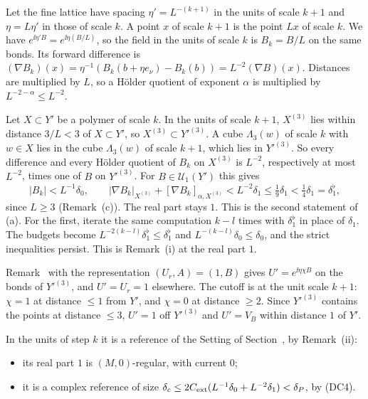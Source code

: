 \begin{step}
Let the fine lattice have spacing $\eta'=L^{-(k+1)}$ in the units of scale $k+1$ and $\eta=L\eta'$ in those of scale $k$. A point $x$ of scale $k+1$ is the point $Lx$ of scale $k$. We have $e^{\ii\eta'B}=e^{\ii\eta(B/L)}$, so the field in the units of scale $k$ is $B_k=B/L$ on the same bonds. Its forward difference is $(\nabla B_k)(x)=\eta^{-1}(B_k(b+\eta e_\nu)-B_k(b))=L^{-2}(\nabla B)(x)$. Distances are multiplied by $L$, so a Hölder quotient of exponent $\alpha$ is multiplied by $L^{-2-\alpha}\le L^{-2}$.

Let $X\subset Y'$ be a polymer of scale $k$. In the units of scale $k+1$, $X^{(3)}$ lies within distance $3/L<3$ of $X\subset Y'$, so $X^{(3)}\subset Y'^{(3)}$. A cube $\Lambda_3(w)$ of scale $k$ with $w\in X$ lies in the cube $\Lambda_3(w)$ of scale $k+1$, which lies in $Y'^{(3)}$. So every difference and every Hölder quotient of $B_k$ on $X^{(3)}$ is $L^{-2}$, respectively at most $L^{-2}$, times one of $B$ on $Y'^{(3)}$. For $B\in\mathcal U_1(Y')$ this gives
\[
|B_k|<L^{-1}\delta_0,\qquad|\nabla B_k|_{X^{(3)}}+[\nabla B_k]_{\alpha,X^{(3)}}<L^{-2}\delta_1\le\tfrac19\delta_1<\tfrac14\delta_1=\delta_1^\flat ,
\]
since $L\ge3$ (Remark~(c)). The real part stays $1$. This is the second statement of (a). For the first, iterate the same computation $k-l$ times with $\delta_1^\flat$ in place of $\delta_1$. The budgets become $L^{-2(k-l)}\delta_1^\flat\le\delta_1^\flat$ and $L^{-(k-l)}\delta_0\le\delta_0$, and the strict inequalities persist. This is Remark~(i) at the real part $1$.
\end{step}

\begin{step}
Remark~ with the representation $(U_r,A)=(1,B)$ gives $U'=e^{\ii\eta\chi B}$ on the bonds of $Y'^{(3)}$, and $U'=U_r=1$ elsewhere. The cutoff is at the unit scale $k+1$: $\chi=1$ at distance $\le1$ from $Y'$, and $\chi=0$ at distance $\ge2$. Since $Y'^{(3)}$ contains the points at distance $\le3$, $U'=1$ off $Y'^{(3)}$ and $U'=V_B$ within distance $1$ of $Y'$.

In the units of step $k$ it is a reference of the Setting of Section~, by Remark~(ii):
\begin{itemize}
\item its real part $1$ is $(M,0)$-regular, with current $0$;
\item it is a complex reference of size $\delta_c\le2C_{\rm ext}(L^{-1}\delta_0+L^{-2}\delta_1)<\delta_P$, by (DC4).
\end{itemize}
\end{step}

